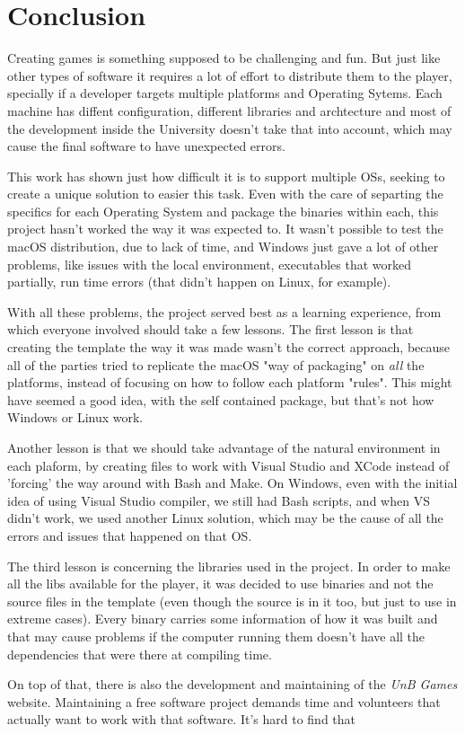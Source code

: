 \chapter{Conclusion}
\label{sec:conclusion}

Creating games is something supposed to be challenging and fun. But just like other types of software it requires a lot of effort to distribute them to the player, specially if a developer targets multiple platforms and Operating Sytems. Each machine has diffent configuration, different libraries and archtecture and most of the development inside the University doesn't take that into account, which may cause the final software to have unexpected errors.

This work has shown just how difficult it is to support multiple OSs, seeking to create a unique solution to easier this task. Even with the care of separting the specifics for each Operating System and package the binaries within each, this project hasn't worked the way it was expected to. It wasn't possible to test the macOS distribution, due to lack of time, and Windows just gave a lot of other problems, like issues with the local environment, executables that worked partially, run time errors (that didn't happen on Linux, for example).

With all these problems, the project served best as a learning experience, from which everyone involved should take a few lessons. The first lesson is that creating the template the way it was made wasn't the correct approach, because all of the parties tried to replicate the macOS "way of packaging" on \textit{all} the platforms, instead of focusing on how to follow each platform "rules". This might have seemed a good idea, with the self contained package, but that's not how Windows or Linux work.

Another lesson is that we should take advantage of the natural environment in each plaform, by creating files to work with Visual Studio and XCode instead of 'forcing' the way around with Bash and Make. On Windows, even with the initial idea of using Visual Studio compiler, we still had Bash scripts, and when VS didn't work, we used another Linux solution, which may be the cause of all the errors and issues that happened on that OS.

The third lesson is concerning the libraries used in the project. In order to make all the libs available for the player, it was decided to use binaries and not the source files in the template (even though the source is in it too, but just to use in extreme cases). Every binary carries some information of how it was built and that may cause problems if the computer running them doesn't have all the dependencies that were there at compiling time.

On top of that, there is also the development and maintaining of the \textit{UnB Games} website. Maintaining a free software project demands time and volunteers that actually want to work with that software. It's hard to find that
